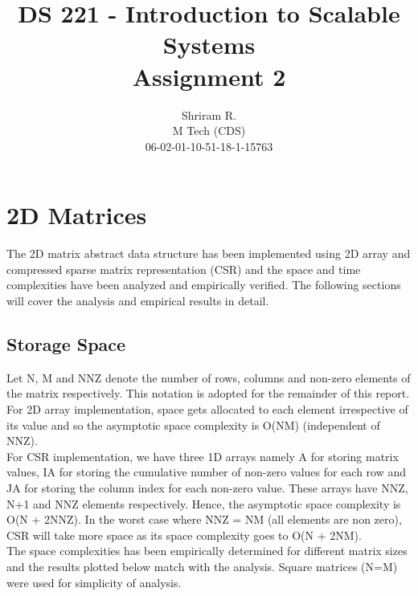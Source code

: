 \documentclass[11pt,a4paper,oneside]{article}
\begin{document}
	\title{DS 221 - Introduction to Scalable Systems \\ Assignment 2}
	\author{Shriram R. \\ M Tech (CDS) \\ 06-02-01-10-51-18-1-15763}
	\maketitle
	
	\section{2D Matrices}
	The 2D matrix abstract data structure has been implemented using 2D array and compressed sparse matrix representation (CSR) and the space and time complexities have been analyzed and empirically verified.
	The following sections will cover the analysis and empirical results in detail.
	
	\subsection{Storage Space}
	Let N, M and NNZ denote the number of rows, columns and non-zero elements of the matrix respectively. This notation is adopted for the remainder of this report. For 2D array implementation, space gets allocated to each element irrespective of its value and so the asymptotic space complexity is O(NM) (independent of NNZ). \\
	\newline
	For CSR implementation, we have three 1D arrays namely A for storing matrix values, IA for storing the cumulative number of non-zero values for each row and JA for storing the column index for each non-zero value. These arrays have NNZ, N+1 and NNZ elements respectively. Hence, the asymptotic space complexity is O(N + 2NNZ). In the worst case where NNZ = NM (all elements are non zero), CSR will take more space as its space complexity goes to O(N + 2NM). \\
	\newline
	The space complexities has been empirically determined for different matrix sizes and the results plotted below match with the analysis. Square matrices (N=M) were used for simplicity of analysis.
	
\end{document}
